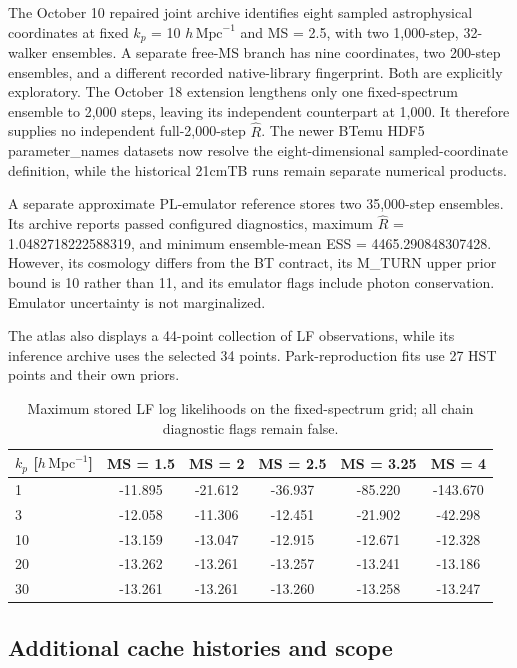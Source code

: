 The October 10 repaired joint archive identifies eight sampled astrophysical coordinates at fixed \ensuremath{k_p} = 10 $h\,\mathrm{Mpc}^{-1}$ and MS = 2.5, with two 1,000-step, 32-walker ensembles. A separate free-MS branch has nine coordinates, two 200-step ensembles, and a different recorded native-library fingerprint. Both are explicitly exploratory. The October 18 extension lengthens only one fixed-spectrum ensemble to 2,000 steps, leaving its independent counterpart at 1,000. It therefore supplies no independent full-2,000-step \(\widehat R\). The newer BTemu HDF5 parameter\_names datasets now resolve the eight-dimensional sampled-coordinate definition, while the historical 21cmTB runs remain separate numerical products.

A separate approximate PL-emulator reference stores two 35,000-step ensembles. Its archive reports passed configured diagnostics, maximum \(\widehat R\) = 1.0482718222588319, and minimum ensemble-mean ESS = 4465.290848307428. However, its cosmology differs from the BT contract, its M\_TURN upper prior bound is 10 rather than 11, and its emulator flags include photon conservation. Emulator uncertainty is not marginalized.

The atlas also displays a 44-point collection of LF observations, while its inference archive uses the selected 34 points. Park-reproduction fits use 27 HST points and their own priors.

\begin{table}[t]
\caption{Maximum stored LF log likelihoods on the fixed-spectrum grid; all chain diagnostic flags remain false.}
\label{tab:lf-values}
\centering\small
\begin{tabular}{lccccc}
\toprule
\ensuremath{k_p} {[}$h\,\mathrm{Mpc}^{-1}${]} & MS = 1.5 & MS = 2 & MS = 2.5 & MS = 3.25 & MS = 4 \\
\midrule
1 & -11.895 & -21.612 & -36.937 & -85.220 & -143.670 \\
3 & -12.058 & -11.306 & -12.451 & -21.902 & -42.298 \\
10 & -13.159 & -13.047 & -12.915 & -12.671 & -12.328 \\
20 & -13.262 & -13.261 & -13.257 & -13.241 & -13.186 \\
30 & -13.261 & -13.261 & -13.260 & -13.258 & -13.247 \\
\bottomrule
\end{tabular}
\end{table}

\subsection{Additional cache histories and scope}

